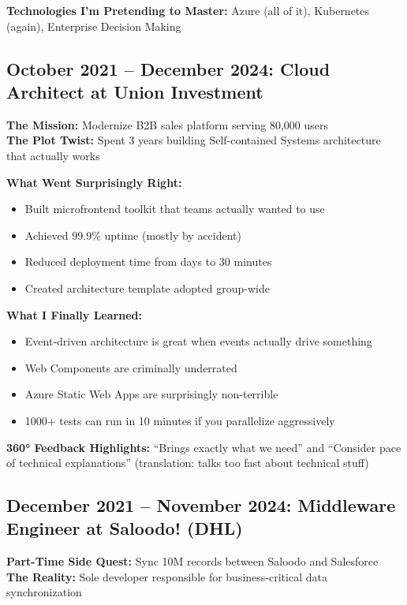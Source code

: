 \documentclass[11pt,a4paper]{article}
\begin{document}
\textbf{Technologies I'm Pretending to Master:} Azure (all of it), Kubernetes (again), Enterprise Decision Making

\subsection{October 2021 -- December 2024: Cloud Architect at Union Investment}
\textbf{The Mission:} Modernize B2B sales platform serving 80,000 users\\
\textbf{The Plot Twist:} Spent 3 years building Self-contained Systems architecture that actually works

\textbf{What Went Surprisingly Right:}
\begin{itemize}[leftmargin=1.5em, itemsep=0.1em]
\item Built microfrontend toolkit that teams actually wanted to use
\item Achieved 99.9\% uptime (mostly by accident)
\item Reduced deployment time from days to 30 minutes
\item Created architecture template adopted group-wide
\end{itemize}

\textbf{What I Finally Learned:}
\begin{itemize}[leftmargin=1.5em, itemsep=0.1em]
\item Event-driven architecture is great when events actually drive something
\item Web Components are criminally underrated
\item Azure Static Web Apps are surprisingly non-terrible
\item 1000+ tests can run in 10 minutes if you parallelize aggressively
\end{itemize}

\textbf{360° Feedback Highlights:} ``Brings exactly what we need'' and ``Consider pace of technical explanations'' (translation: talks too fast about technical stuff)

\subsection{December 2021 -- November 2024: Middleware Engineer at Saloodo! (DHL)}
\textbf{Part-Time Side Quest:} Sync 10M records between Saloodo and Salesforce\\
\textbf{The Reality:} Sole developer responsible for business-critical data synchronization
\end{document}

